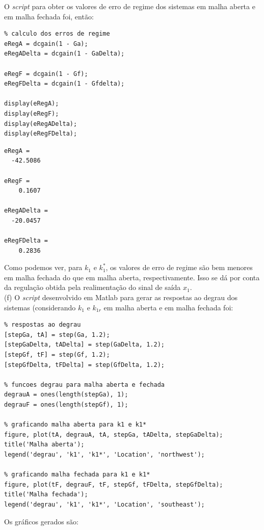 \documentclass[a4paper,11pt]{article}
\begin{document}
O \textit{script} para obter os valores de erro de regime dos sistemas em malha
aberta e em malha fechada foi, então:

\begin{lstlisting}
% calculo dos erros de regime
eRegA = dcgain(1 - Ga);
eRegADelta = dcgain(1 - GaDelta);

eRegF = dcgain(1 - Gf);
eRegFDelta = dcgain(1 - Gfdelta);

display(eRegA);
display(eRegF);
display(eRegADelta);
display(eRegFDelta);
\end{lstlisting}

\begin{lstlisting}
eRegA =
  -42.5086

eRegF =
    0.1607

eRegADelta =
  -20.0457

eRegFDelta =
    0.2836
\end{lstlisting}

Como podemos ver, para $k_1$ e $k_1^\ast$, os valores de erro de regime são
bem menores em malha fechada do que em malha aberta, respectivamente.
Isso se dá por conta da regulação obtida pela realimentação do sinal de saída
$x_1$. \\

(f) O \textit{script} desenvolvido em Matlab para gerar as respostas ao degrau
dos sistemas (considerando $k_1$ e $k_{1r}$ em malha aberta e em malha fechada
foi:

\begin{lstlisting}
% respostas ao degrau
[stepGa, tA] = step(Ga, 1.2);
[stepGaDelta, tADelta] = step(GaDelta, 1.2);
[stepGf, tF] = step(Gf, 1.2);
[stepGfDelta, tFDelta] = step(GfDelta, 1.2);

% funcoes degrau para malha aberta e fechada
degrauA = ones(length(stepGa), 1);
degrauF = ones(length(stepGf), 1);

% graficando malha aberta para k1 e k1*
figure, plot(tA, degrauA, tA, stepGa, tADelta, stepGaDelta);
title('Malha aberta');
legend('degrau', 'k1', 'k1*', 'Location', 'northwest');

% graficando malha fechada para k1 e k1*
figure, plot(tF, degrauF, tF, stepGf, tFDelta, stepGfDelta);
title('Malha fechada');
legend('degrau', 'k1', 'k1*', 'Location', 'southeast');
\end{lstlisting}

Os gráficos gerados são:
\end{document}

